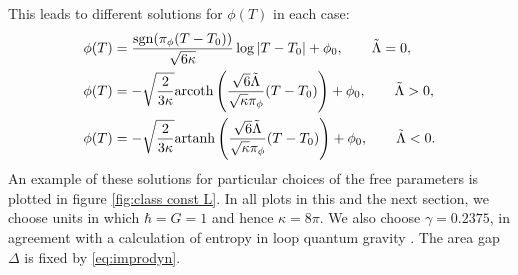 \documentclass[aps,prd,11pt,showkeys,nofootinbib]{revtex4-2}
\begin{document}
This leads to different solutions for $\phi(T)$ in each case:
\begin{align}
    \phi(T) &= \frac{{\rm sgn}(\pi_\phi(T-T_0))}{\sqrt{6\kappa}}\log|T-T_0|+\phi_0,\qquad \tilde{\Lambda} = 0,\\
    \phi(T) &= -\sqrt{\frac{2}{3\kappa}}\textrm{arcoth}\left(\frac{\sqrt{6}\tilde\Lambda}{\sqrt{\kappa}\pi_\phi}(T-T_0)\right)+ \phi_0, \qquad \tilde{\Lambda} > 0,\\
    \phi(T) &= -\sqrt{\frac{2}{3\kappa}}\textrm{artanh}\left(\frac{\sqrt{6}\tilde\Lambda}{\sqrt{\kappa}\pi_\phi}(T-T_0)\right)+ \phi_0, \qquad \tilde{\Lambda} < 0.
\end{align}
An example of these solutions for particular choices of the free parameters is plotted in figure \ref{fig:class const L}. In all plots in this and the next section, we choose units in which $\hbar=G=1$ and hence $\kappa=8\pi$. We also choose $\gamma=0.2375$, in agreement with a calculation of entropy in loop quantum gravity \cite{Meissner:2004ju}. The area gap $\Delta$ is fixed by \eqref{eq:improdyn}.
\end{document}
